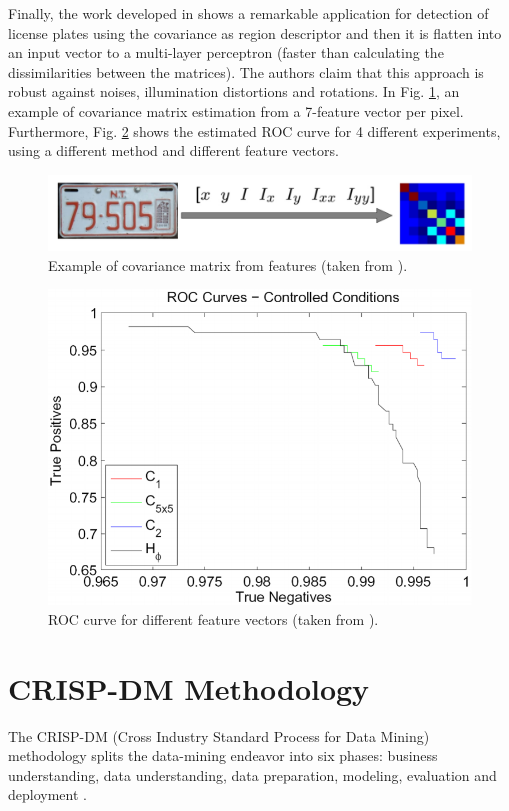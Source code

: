 \documentclass[11pt]{article}
\theoremstyle{definition}
\theoremstyle{remark}
\theoremstyle{remark}
\theoremstyle{remark}
\begin{document}
Finally, the work developed in \parencite{porikli2006robust} shows a remarkable application for detection of license plates using the covariance as region descriptor and then it is flatten into an input vector to a multi-layer perceptron (faster than calculating the dissimilarities between the matrices). The authors claim that this approach is robust against noises, illumination distortions and rotations. In Fig. \ref{fig:plate}, an example of covariance matrix estimation from a 7-feature vector per pixel. Furthermore, Fig. \ref{fig:roc} shows the estimated ROC curve for 4 different experiments, using a different method and different feature vectors.

\begin{figure}[H]
    \centering
    \includegraphics[scale=0.2]{plate.png}
    \caption{Example of covariance matrix from features (taken from \parencite{porikli2006robust}).}
    \label{fig:plate}
\end{figure}

\begin{figure}[H]
    \centering
    \includegraphics[scale=0.3]{roc.png}
    \caption{ROC curve for different feature vectors (taken from \parencite{porikli2006robust}).}
    \label{fig:roc}
\end{figure}

\section{CRISP-DM Methodology}\label{sec:crisp}
The CRISP-DM (Cross Industry Standard Process for Data Mining) methodology splits the data-mining endeavor into six phases: business understanding, data understanding, data preparation, modeling, evaluation and deployment \cite{Chapman2000CRISPDM1S}. 
\end{document}
